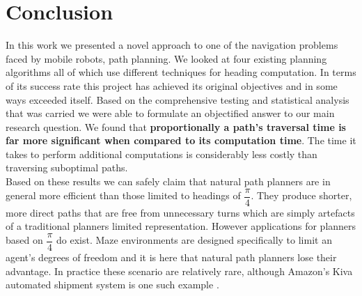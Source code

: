 \chapter{Conclusion}

\noindent
In this work we presented a novel approach to one of the navigation problems faced by mobile robots, path planning. We looked at four existing planning algorithms all of which use different techniques for heading computation. In terms of its success rate this project has achieved its original objectives and in some ways exceeded itself. Based on the comprehensive testing and statistical analysis that was carried we were able to formulate an objectified answer to our main research question. We found that \textbf{proportionally a path's traversal time is far more significant when compared to its computation time}. The time it takes to perform additional computations is considerably less costly than traversing suboptimal paths. \\

\noindent
Based on these results we can safely claim that natural path planners are in general more efficient than those limited to headings of $\dfrac{\pi}{4}$. They produce shorter, more direct paths that are free from unnecessary turns which are simply artefacts of a traditional planners limited representation. However applications for planners based on $\dfrac{\pi}{4}$ do exist. Maze environments are designed specifically to limit an agent's degrees of freedom and it is here that natural path planners lose their advantage. In practice these scenario are relatively rare, although Amazon's Kiva automated shipment system is one such example \cite{AZK12}. 

